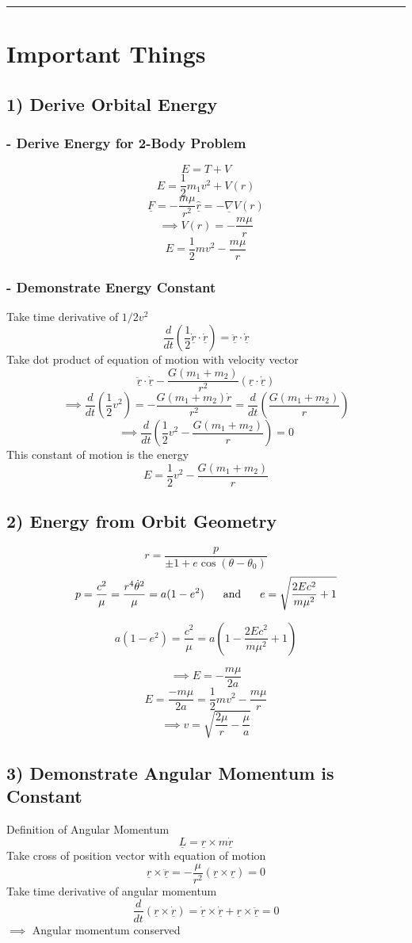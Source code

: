 \documentclass[table,cmyk,fleqn]{article}
\begin{document}
\begin{longtable}
\noindent\rule{9cm}{0.4pt}
\section*{Important Things}
\subsection*{1) Derive Orbital Energy}
\subsubsection*{- Derive Energy for 2-Body Problem}
\[E = T+V\]
\[E = \frac{1}{2}m_1v^2 + V(r)\]
\[\underline{F} = -\frac{m\mu}{r^2}\hat{\underline{r}} = -\underline{\nabla} V(r)\]
\[\implies V(r) = -\frac{m\mu}{r}\]
\[E = \frac{1}{2}mv^2 - \frac{m\mu}{r}\]

\subsubsection*{- Demonstrate Energy Constant}
Take time derivative of $1/2 v^2$
\[\frac{d}{dt}\left( \frac{1}{2}\dot{\underline{r}}\cdot\dot{\underline{r}}\right) = \ddot{\underline{r}}\cdot \dot{\underline{r}}\]
Take dot product of equation of motion with velocity vector
\[\ddot{\underline{r}}\cdot\dot{\underline{r}}  -\frac{G(m_1+m_2)}{r^2}(\hat{\underline{r}}\cdot\dot{\underline{r}})\]
\[\implies \frac{d}{dt}\left( \frac{1}{2}v^2\right) = -\frac{G(m_1+m_2)\dot{r}}{r^2} = \frac{d}{dt}\left(\frac{G(m_1+m_2)}{r}\right)\]
\[\implies \frac{d}{dt}\left( \frac{1}{2}v^2 - \frac{G(m_1+m_2)}{r}\right) = 0\]
\tabularnewline\hline
This constant of motion is the energy
\[E = \frac{1}{2}v^2-\frac{G(m_1+m_2)}{r}\]
\subsection*{2) Energy from Orbit Geometry}
\[ r = \frac{p}{\pm1+e\cos (\theta-\theta_0)}\]
\[p = \frac{c^2}{\mu}=\frac{r^4\dot{\theta}^2}{\mu}=a(1-e^2)\text{\hspace{0.6cm}and\hspace{0.6cm}}e = \sqrt{\frac{2Ec^2}{m\mu^2}+1}\]

\[a(1-e^2)=\frac{c^2}{\mu}=a\left( 1 - \frac{2Ec^2}{m\mu^2}+1\right)\]

\[\implies E = -\frac{m\mu}{2a}\]
\[E = \frac{-m\mu}{2a} = \frac{1}{2}mv^2-\frac{m\mu}{r}\]
\[\implies v = \sqrt{\frac{2\mu}{r}-\frac{\mu}{a}}\]
\subsection*{3) Demonstrate Angular Momentum is Constant}
Definition of Angular Momentum
\[\underline{L} = \underline{r} \times m\dot{\underline{r}}\]
Take cross of position vector with equation of motion
\[\underline{r} \times \underline{\ddot{r}} = -\frac{\mu}{r^2}(\underline{r}\times\underline{\hat{r}})=0\]
Take time derivative of angular momentum
\[\frac{d}{dt}(\underline{r}\times\underline{\dot{r}}) = \underline{\dot{r}}\times\underline{\dot{r}}+\underline{r}\times\underline{\ddot{r}}= 0\]
$\implies$ Angular momentum conserved

\end{longtable}
\end{document}
